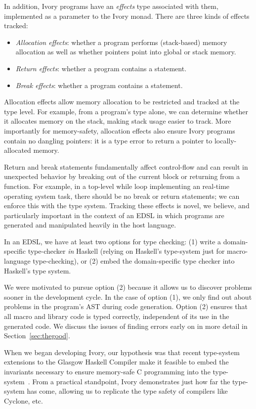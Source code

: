 In addition, Ivory programs have an \emph{effects} type associated with them,
implemented as a parameter to the Ivory monad.  There are three kinds of effects
tracked:
\begin{itemize}
  \item \emph{Allocation effects}: whether a program performs (stack-based)
    memory allocation as well as whether pointers point into global or stack memory.
  \item \emph{Return effects}: whether a program contains a  statement.
  \item \emph{Break effects}: whether a program contains a 
    statement.
\end{itemize}
\noindent
Allocation effects allow memory allocation to be restricted and tracked at the
type level.  For example, from a program's type alone, we can determine whether
it allocates memory on the stack, making stack usage easier to track.  More
importantly for memory-safety, allocation effects also ensure Ivory programs
contain no dangling pointers: it is a type error to return a pointer to
locally-allocated memory.

Return and break statements fundamentally affect control-flow and can result in
unexpected behavior by breaking out of the current block or returning from a
function.  For example, in a top-level while loop implementing an real-time
operating system task, there should be no break or return statements; we can
enforce this with the type system.  Tracking these effects is novel, we believe,
and particularly important in the context of an EDSL in which programs are
generated and manipulated heavily in the host language.

In an EDSL, we have at least two options for type checking: (1) write a
domain-specific type-checker \emph{in} Haskell (relying on Haskell's type-system
just for macro-language type-checking), or (2) embed the domain-specific type
checker into Haskell's type system.

We were motivated to pursue option (2) because it allows us to discover problems
sooner in the development cycle. In the case of option (1), we only find out
about problems in the program's AST during code generation. Option (2) ensures
that all macro and library code is typed correctly, independent of its use in
the generated code. We discuss the issues of finding errors early on in more
detail in Section~\ref{sec:thegood}.

When we began developing Ivory, our hypothesis  was that recent type-system
extensions to the Glasgow Haskell Compiler make it feasible to embed the
invariants necessary to ensure memory-safe C programming into the
type-system~\cite{dephaskell}. From a practical standpoint, Ivory demonstrates
just how far the type-system has come, allowing us to replicate the type safety
of compilers like Cyclone, etc.

